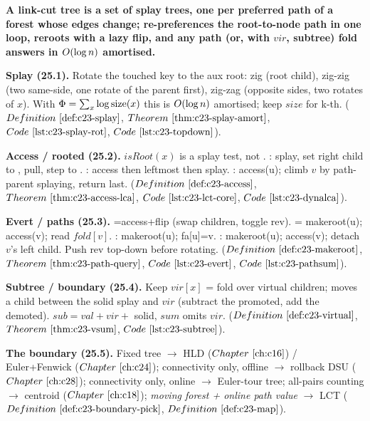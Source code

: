 \begin{quickref}
\textbf{A link-cut tree is a set of splay trees, one per preferred path of a forest whose edges
change;  re-preferences the root-to-node path in one loop,  reroots with
a lazy flip, and any path (or, with \(\mathit{vir}\), subtree) fold answers in \(O(\log n)\) amortised. }

\medskip
\textbf{Splay (25.1).} Rotate the touched key to the aux root: zig (root child), zig-zig (two same-side,
one rotate of the parent first), zig-zag (opposite sides, two rotates of \(x\)). With
\(\Phi=\sum_x\log\operatorname{size}(x)\) this is \(O(\log n)\) amortised; keep \(\mathit{size}\) for k-th.
(\(\defref{c23-splay}\), \(\thmref{c23-splay-amort}\), \(\coderef{c23-splay-rot}\), \(\coderef{c23-topdown}\)).

\medskip
\textbf{Access / rooted (25.2).} \(\mathit{isRoot}(x)\) is a splay test, not . :
splay, set right child to , pull, step to . : access then leftmost then
splay. : access(u); climb \(v\) by path-parent splaying, return last.
(\(\defref{c23-access}\), \(\thmref{c23-access-lca}\), \(\coderef{c23-lct-core}\), \(\coderef{c23-dynalca}\)).

\medskip
\textbf{Evert / paths (25.3).} =access+flip (swap children, toggle rev). =
makeroot(u); access(v); read \(\mathit{fold}[v]\). : makeroot(u); fa[u]=v. : makeroot(u);
access(v); detach \(v\)'s left child. Push rev top-down before rotating.
(\(\defref{c23-makeroot}\), \(\thmref{c23-path-query}\), \(\coderef{c23-evert}\), \(\coderef{c23-pathsum}\)).

\medskip
\textbf{Subtree / boundary (25.4).} Keep \(\mathit{vir}[x]\) = fold over virtual children; 
moves a child between the solid splay and \(\mathit{vir}\) (subtract the promoted, add the demoted).
\(\mathit{sub}=\mathit{val}+\mathit{vir}+\) solid, \(\mathit{sum}\) omits \(\mathit{vir}\).
(\(\defref{c23-virtual}\), \(\thmref{c23-vsum}\), \(\coderef{c23-subtree}\)).

\medskip
\textbf{The boundary (25.5).} Fixed tree \(\to\) HLD (\(\chref{c16}\)) / Euler+Fenwick (\(\chref{c24}\));
connectivity only, offline \(\to\) rollback DSU (\(\chref{c28}\)); connectivity only, online \(\to\)
Euler-tour tree; all-pairs counting \(\to\) centroid (\(\chref{c18}\)); \emph{moving forest + online path
value} \(\to\) LCT (\(\defref{c23-boundary-pick}\), \(\defref{c23-map}\)).
\end{quickref}

